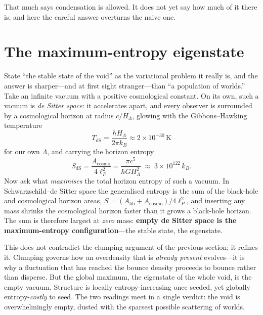 That much says condensation is allowed. It does not yet say how much of it there
is, and here the careful answer overturns the naive one.

\section{The maximum-entropy eigenstate}
\label{sec:void-eigenstate}

State ``the stable state of the void'' as the variational problem it really is, and
the answer is sharper---and at first sight stranger---than ``a population of worlds.'' Take an
infinite vacuum with a positive cosmological constant. On its own, such a vacuum
is \emph{de Sitter space}: it accelerates apart, and every observer is surrounded
by a cosmological horizon at radius $c/H_\Lambda$, glowing with the
Gibbons--Hawking temperature~\citep{gibbons1977}
\[
  T_{\mathrm{dS}} = \frac{\hbar H_\Lambda}{2\pi k_B}
  \approx 2\times10^{-30}\,\mathrm{K}
\]
for our own $\Lambda$, and carrying the horizon entropy
\begin{equation}
  S_{\mathrm{dS}} = \frac{A_{\mathrm{cosmo}}}{4\ell_P^2}
  = \frac{\pi c^5}{\hbar G H_\Lambda^2}
  \;\approx\; 3\times10^{122}\,k_B .
  \label{eq:gibbons-hawking}
\end{equation}
Now ask what \emph{maximises} the total horizon entropy of such a vacuum. In
Schwarzschild--de Sitter space the generalised entropy is the sum of the
black-hole and cosmological horizon areas, $S=(A_{\mathrm{bh}}+A_{\mathrm{cosmo}})/
4\ell_P^2$, and inserting any mass shrinks the cosmological horizon faster than it
grows a black-hole horizon. The sum is therefore largest at \emph{zero} mass:
\textbf{empty de Sitter space is the maximum-entropy configuration}---the stable
state, the eigenstate.

This does not contradict the clumping argument of the previous section; it refines
it. Clumping governs how an overdensity that is \emph{already present} evolves---it
is why a fluctuation that has reached the bounce density proceeds to bounce rather
than disperse. But the global maximum, the eigenstate of the whole void, is the
empty vacuum. Structure is locally entropy-increasing once seeded, yet globally
entropy-\emph{costly} to seed. The two readings meet in a single verdict: the void
is overwhelmingly empty, dusted with the sparsest possible scattering of worlds.

